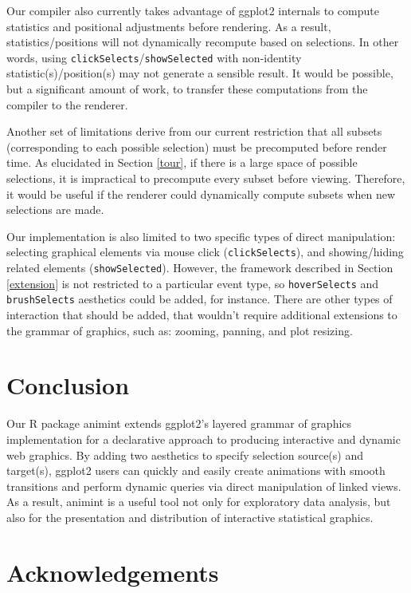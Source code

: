 \documentclass[12pt,]{article}
\theoremstyle{definition}
\theoremstyle{definition}
\theoremstyle{remark}
\begin{document}
Our compiler also currently takes advantage of ggplot2 internals to
compute statistics and positional adjustments before rendering. As a
result, statistics/positions will not dynamically recompute based on
selections. In other words, using
\texttt{clickSelects}/\texttt{showSelected} with non-identity
statistic(s)/position(s) may not generate a sensible result. It would be
possible, but a significant amount of work, to transfer these
computations from the compiler to the renderer.

Another set of limitations derive from our current restriction that all
subsets (corresponding to each possible selection) must be precomputed
before render time. As elucidated in Section \ref{tour}, if there is a
large space of possible selections, it is impractical to precompute
every subset before viewing. Therefore, it would be useful if the
renderer could dynamically compute subsets when new selections are made.

Our implementation is also limited to two specific types of direct
manipulation: selecting graphical elements via mouse click
(\texttt{clickSelects}), and showing/hiding related elements
(\texttt{showSelected}). However, the framework described in Section
\ref{extension} is not restricted to a particular event type, so
\texttt{hoverSelects} and \texttt{brushSelects} aesthetics could be
added, for instance. There are other types of interaction that should be
added, that wouldn't require additional extensions to the grammar of
graphics, such as: zooming, panning, and plot resizing.

\section{Conclusion}\label{conclusion}

Our R package animint extends ggplot2's layered grammar of graphics
implementation for a declarative approach to producing interactive and
dynamic web graphics. By adding two aesthetics to specify selection
source(s) and target(s), ggplot2 users can quickly and easily create
animations with smooth transitions and perform dynamic queries via
direct manipulation of linked views. As a result, animint is a useful
tool not only for exploratory data analysis, but also for the
presentation and distribution of interactive statistical graphics.

\section*{Acknowledgements}
\end{document}
